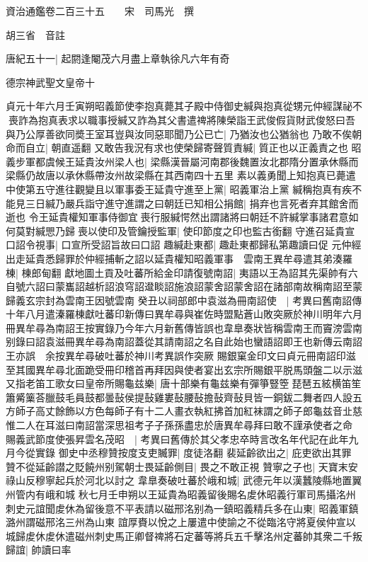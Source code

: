 資治通鑑卷二百三十五　　宋　司馬光　撰

胡三省　音註

唐紀五十一|{
	起閼逢閹茂六月盡上章執徐凡六年有奇}


德宗神武聖文皇帝十

貞元十年六月壬寅朔昭義節使李抱真薨其子殿中侍御史緘與抱真從甥元仲經謀祕不喪詐為抱真表求以職事授緘又詐為其父書遣禆將陳榮詣王武俊假貨財武俊怒曰吾與乃公厚善欲同奬王室耳豈與汝同惡耶聞乃公已亡|{
	乃猶汝也公猶翁也}
乃敢不俟朝命而自立|{
	朝直遥翻}
又敢告我況有求也使榮歸寄聲質責緘|{
	質正也以正義責之也}
昭義步軍都虞候王延貴汝州梁人也|{
	梁縣漢晉屬河南郡後魏置汝北郡隋分置承休縣而梁縣仍故唐以承休縣帶汝州故梁縣在其西南四十五里}
素以義勇聞上知抱真已薨遣中使第五守進往觀變且以軍事委王延貴守進至上黨|{
	昭義軍治上黨}
緘稱抱真有疾不能見三日緘乃嚴兵詣守進守進謂之曰朝廷已知相公捐館|{
	捐弃也言死者弃其館舍而逝也}
令王延貴權知軍事侍御宜喪行服緘愕然出謂諸將曰朝廷不許緘掌事諸君意如何莫對緘愳乃歸喪以使印及管鑰授監軍|{
	使印節度之印也監古銜翻}
守進召延貴宣口詔令視事|{
	口宣所受詔旨故曰口詔}
趣緘赴東都|{
	趣赴東都歸私第趣讀曰促}
元仲經出走延貴悉歸罪於仲經捕斬之詔以延貴權知昭義軍事　雲南王異牟尋遣其弟湊羅棟|{
	棟郎甸翻}
獻地圖土貢及吐蕃所給金印請復號南詔|{
	夷語以王為詔其先渠帥有六自號六詔曰蒙巂詔越析詔浪穹詔邆睒詔施浪詔蒙舍詔蒙舍詔在諸部南故稱南詔至蒙歸義玄宗封為雲南王因號雲南}
癸丑以祠部郎中袁滋為冊南詔使　|{
	考異曰舊南詔傳十年八月遣溱羅棟獻吐蕃印新傳曰異牟尋與崔佐時盟點蒼山敗突厥於神川明年六月冊異牟尋為南詔王按實錄乃今年六月新舊傳皆誤也韋臯奏狀皆稱雲南王而竇滂雲南别錄曰詔袁滋冊異牟尋為南詔蓋從其請南詔之名自此始也蠻語詔即王也新傳云南詔王亦誤　余按異牟尋破吐蕃於神川考異誤作突厥}
賜銀窠金印文曰貞元冊南詔印滋至其國異牟尋北面跪受冊印稽首再拜因與使者宴出玄宗所賜銀平脱馬頭盤二以示滋又指老笛工歌女曰皇帝所賜龜兹樂|{
	唐十部樂有龜兹樂有彈箏豎箜琵琶五絃横笛笙簫觱篥荅臘鼓毛員鼓都曇鼔侯提鼔雞婁鼔腰鼔擔鼔齊鼔貝皆一銅鈸二舞者四人設五方師子高丈餘飾以方色每師子有十二人畫衣執紅拂首加紅袜謂之師子郎龜兹音㐀慈}
惟二人在耳滋曰南詔當深思祖考子子孫孫盡忠於唐異牟尋拜曰敢不謹承使者之命　賜義武節度使張昇雲名茂昭　|{
	考異曰舊傳於其父孝忠卒時言改名年代記在此年九月今從實錄}
御史中丞穆贊按度支吏贓罪|{
	度徒洛翻}
裴延齡欲出之|{
	庇吏欲出其罪}
贊不從延齡譛之貶饒州别駕朝士畏延齡側目|{
	畏之不敢正視}
贊寧之子也|{
	天寶末安祿山反穆寧起兵於河北以討之}
韋臯奏破吐蕃於峨和城|{
	武德元年以漢蠶陵縣地置翼州管内有峨和城}
秋七月壬申朔以王延貴為昭義留後賜名䖍休昭義行軍司馬攝洺州刺史元誼聞䖍休為留後意不平表請以磁邢洺别為一鎮昭義精兵多在山東|{
	昭義軍鎮潞州謂磁邢洺三州為山東}
誼厚賚以悅之上屢遣中使諭之不從臨洺守將夏侯仲宣以城歸䖍休䖍休遣磁州刺史馬正卿督禆將石定蕃等將兵五千擊洺州定蕃帥其衆二千叛歸誼|{
	帥讀曰率}
